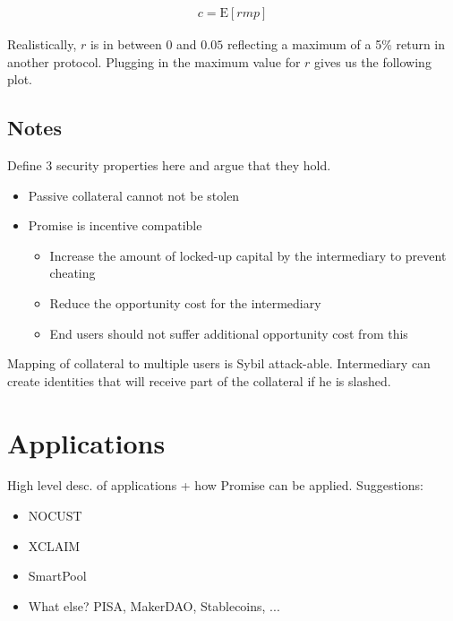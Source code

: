\documentclass[runningheads]{llncs}
\newcommand{\sys}{Promise\xspace}
\begin{document}
\begin{align}
    c = \mathrm{E}[rmp]
\end{align}

Realistically, $r$ is in between $0$ and $0.05$ reflecting a maximum of a 5\% return in another protocol.
Plugging in the maximum value for $r$ gives us the following plot.




\subsection{Notes}
Define 3 security properties here and argue that they hold. 


\begin{itemize}
    \item Passive collateral cannot not be stolen
    \item Promise is incentive compatible
    \begin{itemize}
        \item Increase the amount of locked-up capital by the intermediary to prevent cheating
        \item Reduce the opportunity cost for the intermediary
        \item End users should not suffer additional opportunity cost from this
    \end{itemize}
\end{itemize}

Mapping of collateral to multiple users is Sybil attack-able. Intermediary can create identities that will receive part of the collateral if he is slashed.



\section{Applications}
\label{sec:application}

High level desc. of applications + how \sys can be applied.
Suggestions:
\begin{itemize}
    \item NOCUST
    \item XCLAIM
    \item SmartPool
    \item What else? PISA, MakerDAO, Stablecoins, ...
\end{itemize}
\end{document}
